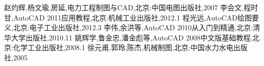 \begin{thebibliography}{99}
 赵灼辉,杨文瑜,房延,电力工程制图与CAD,北京:中国电图出版社,2007
李会文,程时甘,AutoCAD 2011应用教程,北京:机械工业出版社,2012.1
程光远,AutoCAD绘图要义,北京:电子工业出版社,2012.3
李伟,余洪等,AutoCAD 2010从入门到精通,北京:清华大学出版社,2010.11
姚辉学,鲁金忠,潘金彪等,AutoCAD 2008中文版基础教程,北京:化学工业出版社,2008.1
徐元甫,郭玲,陈杰,机械制图,北京:中国水力水电出版社,2005
\end{thebibliography}
\endinput